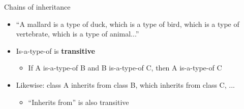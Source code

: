 \begin{frame}{Chains of inheritance}
\begin{itemize}
	\pause\item ``A mallard is a type of duck, which is a type of bird, which is a type of vertebrate, which is a type of animal...''
	\pause\item Is-a-type-of is \textbf{transitive}
	\begin{itemize}
		\pause\item If A is-a-type-of B and B is-a-type-of C, then A is-a-type-of C
	\end{itemize}
	\pause\item Likewise: class A inherits from class B, which inherits from class C, ...
	\begin{itemize}
		\pause\item ``Inherits from'' is also transitive
	\end{itemize}
\end{itemize}
\end{frame}


